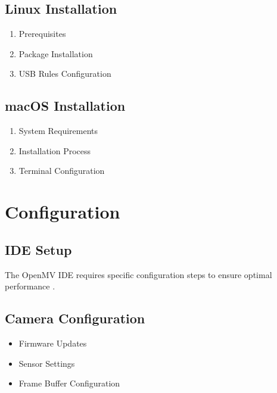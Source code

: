 \subsection{Linux Installation}

\begin{enumerate}
    
    \item Prerequisites
    
    \item Package Installation
    
    \item USB Rules Configuration
    
\end{enumerate}



\subsection{macOS Installation}

\begin{enumerate}
    
    \item System Requirements
    
    \item Installation Process
    
    \item Terminal Configuration
    
\end{enumerate}



\section{Configuration}

\subsection{IDE Setup}

The OpenMV IDE requires specific configuration steps to ensure optimal performance \cite{openmv:2024}.



\subsection{Camera Configuration}

\begin{itemize}
    
    \item Firmware Updates
    
    \item Sensor Settings
    
    \item Frame Buffer Configuration
    
\end{itemize}



